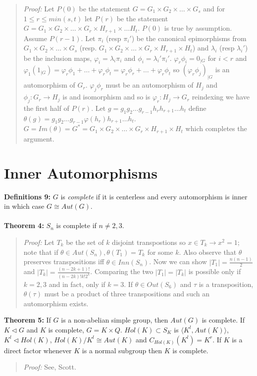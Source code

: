 \begin{quote}
\emph{Proof:}  
Let $P(0)$ be the statement
$G= G_1 \times G_2 \times \ldots \times G_s$ and for $1 \le r \le min(s,t)$
let $P(r)$ be the statement
$G= G_1 \times G_2 \times \ldots \times G_r \times H_{r+1} \times \ldots H_t$.
$P(0)$ is true by assumption. Assume $P(r-1)$.  Let $\pi_i$ (resp $\pi_i'$) be the 
canonical epimorphisms from
$G_1 \times G_2 \times \ldots \times G_s$ (resp.
$G_1 \times G_2 \times \ldots \times G_r \times H_{r+1} \times H_t$)
 and $\lambda_i$ (resp $\lambda_i'$) be the inclusion maps, 
$\varphi_i= \lambda_i \pi_i$
and
$\phi_i= \lambda_i' \pi_i'$.  $\varphi_r \phi_i= 0_{|G}$ for $i<r$ and
$\varphi_1 (1_{|G})= \varphi_r \phi_1 + \ldots + \varphi_r \phi_t=
\varphi_r \phi_r + \ldots + \varphi_r \phi_t$ so $(\varphi_r \phi_j)_{|G}$ is
an automorphism of $G_r$.  $\varphi_j \phi_r$ must be an automorphism of $H_j$ and
$\phi_j:G_r \rightarrow H_j$ is and isomorphism and so is $\varphi_r: H_j \rightarrow G_r$
reindexing we have the first half of $P(r)$.  Let 
$g=g_1 g_2 \ldots g_{r-1} h_r h_{r+1} \ldots h_t$ define 
$\theta(g)=g_1 g_2 \ldots g_{r-1} \varphi(h_r) h_{r+1} \ldots h_t$.  
$G=Im(\theta)=G^*= G_1 \times G_2 \times \ldots \times G_r \times H_{r+1} \times H_t$ 
which completes the argument.
\end{quote}
\section {Inner Automorphisms}
{\bf Definitions 9:} $G$ is \emph{complete} if it is centerless and every automorphism is inner
in which case $G \cong Aut(G)$.
\\
\\
{\bf Theorem 4:} $S_n$ is complete if $n \ne 2,3$.
\begin{quote}
\emph{Proof:}
Let $T_k$ be the set of $k$ disjoint transpostions so $x \in T_k \rightarrow
x^2=1$; note that if $\theta \in Aut(S_n), \theta(T_1)= T_k$ for some $k$. Also
observe that $\theta$ preserves transpositions iff $\theta \in Inn(S_n)$.
Now we can show 
$|T_1|= {\frac {n(n-1)} {2}}$ and
$|T_k|= {\frac {(n-2k+1)!} {(n-2k)! k! 2^k}}$.  Comparing the two $|T_1| = |T_k|$
is possible only if $k=2 ,3$ and in fact, only if $k=3$.   If
$\theta \in Out(S_6)$ and $\tau$ is a transposition, $\theta(\tau)$ must
be a product of three transpositions and such an automorphism exists.
\end{quote}
{\bf Theorem 5:}
If $G$ is a non-abelian simple group, then $Aut(G)$ is complete.  If
$K \lhd G$ and $K$ is complete, $G= K \times Q$.  $Hol(K) \subset S_K$
is $ \langle K^l, Aut(K) \rangle $, $K^l \lhd Hol(K)$, $Hol(K)/K^l \cong Aut(K)$ and
$C_{Hol(K)}(K^l)= K^r$.  If $K$ is a direct factor whenever $K$ is a normal
subgroup then $K$ is complete.
\begin{quote}
\emph{Proof:}
See, Scott.
\end{quote}
